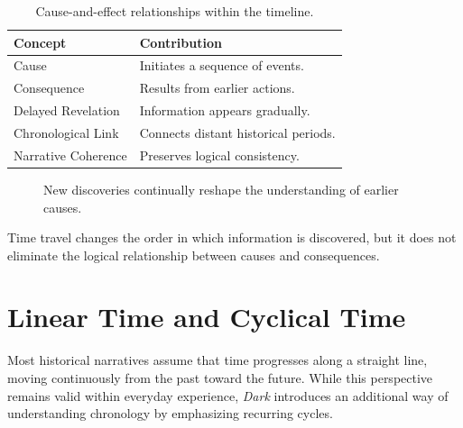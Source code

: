 \documentclass[12pt,oneside,openany]{book}
\begin{document}
\begin{table}[H]
\centering
\begin{tabular}{|p{4.3cm}|p{7.7cm}|}
\hline
\textbf{Concept} & \textbf{Contribution}\\
\hline
Cause & Initiates a sequence of events.\\
\hline
Consequence & Results from earlier actions.\\
\hline
Delayed Revelation & Information appears gradually.\\
\hline
Chronological Link & Connects distant historical periods.\\
\hline
Narrative Coherence & Preserves logical consistency.\\
\hline
\end{tabular}
\caption{Cause-and-effect relationships within the timeline.}
\end{table}

\begin{figure}[H]
\centering
{}

\caption{New discoveries continually reshape the understanding of earlier causes.}
\end{figure}

\begin{tcolorbox}[colback=green!6,colframe=green!50!black,title=Key Concept]
Time travel changes the order in which information is discovered, but it does
not eliminate the logical relationship between causes and consequences.
\end{tcolorbox}

\section{Linear Time and Cyclical Time}

Most historical narratives assume that time progresses along a straight line,
moving continuously from the past toward the future. While this perspective
remains valid within everyday experience, \textit{Dark} introduces an
additional way of understanding chronology by emphasizing recurring cycles.
\end{document}
